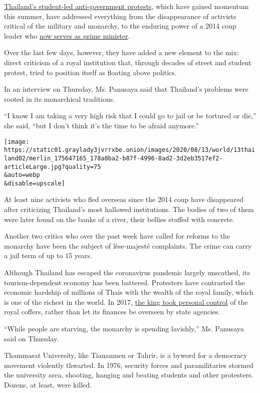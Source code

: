 \href{https://www.nytimes3xbfgragh.onion/2020/08/20/world/asia/thailand-arrests-protests.html}{Thailand's
student-led anti-government protests}, which have gained momentum this
summer, have addressed everything from the disappearance of activists
critical of the military and monarchy, to the enduring power of a 2014
coup leader who
\href{https://www.nytimes3xbfgragh.onion/2019/06/05/world/asia/thailand-prayuth-prime-minister.html}{now
serves as prime minister}.

Over the last few days, however, they have added a new element to the
mix: direct criticism of a royal institution that, through decades of
street and student protest, tried to position itself as floating above
politics.

In an interview on Thursday, Ms. Panusaya said that Thailand's problems
were rooted in its monarchical traditions.

``I know I am taking a very high risk that I could go to jail or be
tortured or die,'' she said, ``but I don't think it's the time to be
afraid anymore.''

\texttt{[image: https://static01.graylady3jvrrxbe.onion/images/2020/08/13/world/13thailand02/merlin\_175647165\_178a0ba2-b87f-4996-8ad2-3d2eb3517ef2-articleLarge.jpg?quality=75\\\&auto=webp\\\&disable=upscale]}

At least nine activists who fled overseas since the 2014 coup have
disappeared after criticizing Thailand's most hallowed institutions. The
bodies of two of them were later found on the banks of a river, their
bellies stuffed with concrete.

Another two critics who over the past week have called for reforms to
the monarchy have been the subject of lèse-majesté complaints. The crime
can carry a jail term of up to 15 years.

Although Thailand has escaped the coronavirus pandemic largely
unscathed, its tourism-dependent economy has been battered. Protesters
have contrasted the economic hardship of millions of Thais with the
wealth of the royal family, which is one of the richest in the world. In
2017,
\href{https://www.nytimes3xbfgragh.onion/2018/06/17/world/asia/thailand-king-assets.html}{the
king took personal control} of the royal coffers, rather than let its
finances be overseen by state agencies.

``While people are starving, the monarchy is spending lavishly,'' Ms.
Panusaya said on Thursday.

Thammasat University, like Tiananmen or Tahrir, is a byword for a
democracy movement violently thwarted. In 1976, security forces and
paramilitaries stormed the university area, shooting, hanging and
beating students and other protesters. Dozens, at least, were killed.

